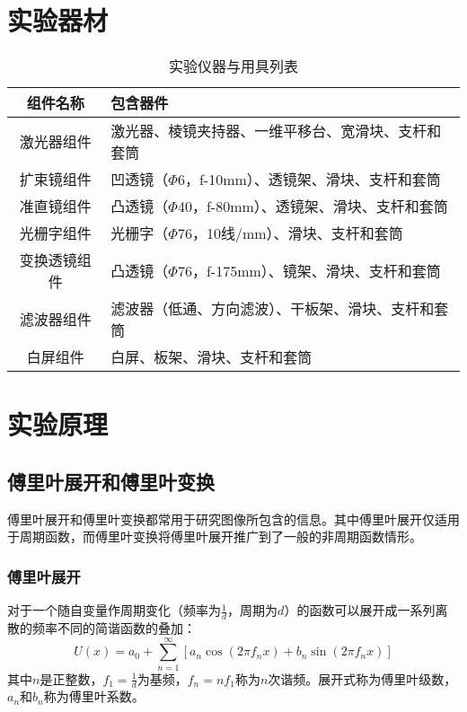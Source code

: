\documentclass[12pt]{article}
\begin{document}
\section{实验器材}
\begin{table}[htbp]
    \centering
    \begin{tabular}[pos]{|c|l|}
        \hline
        组件名称 & 包含器件 \\
        \hline
        激光器组件 & 激光器、棱镜夹持器、一维平移台、宽滑块、支杆和套筒 \\
        \hline
        扩束镜组件 & 凹透镜（$\Phi$6，f-10mm）、透镜架、滑块、支杆和套筒 \\
        \hline
        准直镜组件 & 凸透镜（$\Phi$40，f-80mm）、透镜架、滑块、支杆和套筒 \\
        \hline
        光栅字组件 & 光栅字（$\Phi$76，10线/mm）、滑块、支杆和套筒 \\
        \hline
        变换透镜组件 & 凸透镜（$\Phi$76，f-175mm）、镜架、滑块、支杆和套筒 \\
        \hline
        滤波器组件 & 滤波器（低通、方向滤波）、干板架、滑块、支杆和套筒 \\
        \hline
        白屏组件 & 白屏、板架、滑块、支杆和套筒 \\
        \hline
    \end{tabular}
    \caption{实验仪器与用具列表}
\end{table}

\section{实验原理}
\subsection{傅里叶展开和傅里叶变换}
傅里叶展开和傅里叶变换都常用于研究图像所包含的信息。其中傅里叶展开仅适用于周期函数，而傅里叶变换将傅里叶展开推广到了一般的非周期函数情形。

\subsubsection{傅里叶展开}
对于一个随自变量作周期变化（频率为$\frac{1}{d}$，周期为$d$）的函数可以展开成一系列离散的频率不同的简谐函数的叠加：
\[
    U(x)=a_0+\sum_{n=1}^{\infty}[a_n\cos(2\pi f_n x)+b_n\sin(2\pi f_n x)]
\]
其中$n$是正整数，$f_1=\frac{1}{d}$为基频，$f_n=nf_1$称为$n$次谐频。展开式称为傅里叶级数，$a_n$和$b_n$称为傅里叶系数。
\end{document}
